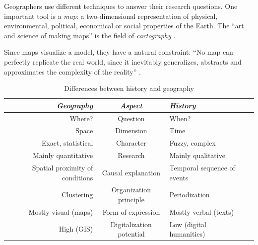 Geographers use different techniques to answer their research questions. One important tool is a \emph{map}: a two-dimensional representation of physical, environmental, political, economical or social properties of the Earth. The ``art and science of making maps'' is the field of \emph{cartography} \cite{cartography}.

Since maps visualize a model, they have a natural constraint: ``No map can perfectly replicate the real world, since it inevitably generalizes, abstracts and approximates the complexity of the reality''
\cite[p. 181]{knowles2008placing}.



\vspace{3em}

\begin{table}[ht]
\begin{center}
\begin{tabular}{p{0px} r c l p{0px}}
    \toprule
    & \emph{Geography}
    & \emph{Aspect}
    & \emph{History}
    & \\
    \midrule
    & Where?
    & Question
    & When?
    & \\

    & Space
    & Dimension
    & Time
    & \\

    & Exact, statistical
    & Character
    & Fuzzy, complex
    & \\

    & Mainly quantitative
    & Research
    & Mainly qualitative
    & \\

    & Spatial proximity of conditions
    & Causal explanation
    & Temporal sequence of events
    & \\

    & Clustering
    & Organization principle
    & Periodization
    & \\

    & Mostly visual (maps)
    & Form of expression
    & Mostly verbal (texts)
    & \\

    & High (GIS)
    & Digitalization potential
    & Low (digital humanities)
    & \\

    \bottomrule
\end{tabular}
\caption{Differences between history and geography \cite[pp. 2-4]{knowles2008placing}}
\label{tab:history_vs_geography}
\end{center}
\end{table}

